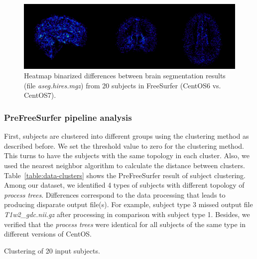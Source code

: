 \documentclass[a4paper,num-refs]{oup-contemporary}
\begin{document}
{\begin{figure}
\centering
  \includegraphics[width=\columnwidth]{images/brain_classification.png} 
  \caption{Heatmap binarized differences between brain segmentation results (file \emph{aseg.hires.mgz}) from 
          20 subjects in FreeSurfer (CentOS6 vs. CentOS7).} 
  \label{fig:tissue_class}
\end{figure}


\subsubsection{PreFreeSurfer pipeline analysis} 

First, subjects are clustered into different groups using the clustering method as described before.
We set the threshold value to zero for the clustering method. 
This turns to have the subjects with the same topology in each cluster.
Also, we used the nearest neighbor algorithm to calculate the distance between clusters.
Table~\ref{table:data-clusters} shows the PreFreeSurfer result of subject clustering. 
Among our dataset, we identified 4 types of subjects with 
different topology of \emph{process trees}. 
Differences correspond to the data processing that leads to producing disparate output file(s).
For example, subject type 3 missed output file \emph{T1w2\_gdc.nii.gz} after processing 
in comparison with subject type 1.
Besides, we verified that 
the \emph{process trees} were identical for all subjects of the same type in 
different versions of CentOS.

\begin{table}
\centering
\begin{threeparttable}
\caption{Clustering of 20 input subjects.}


\end{threeparttable}
\end{table}}
\end{document}
